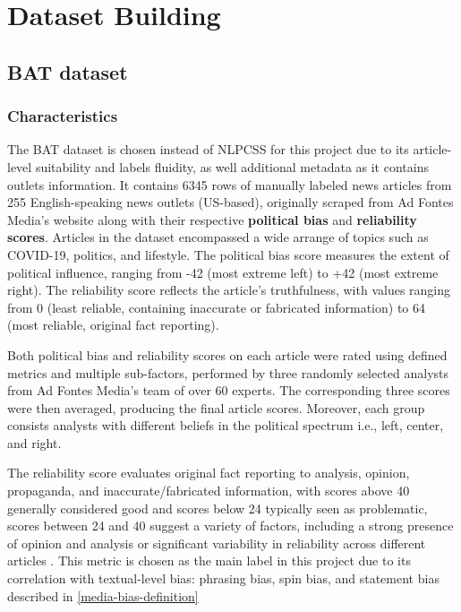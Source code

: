 \chapter{Dataset Building}
\label{cha:4}

\section{BAT dataset}

\subsection{Characteristics} \label{bat-characteristics}

The BAT dataset \cite{spinde-2023-bat} is chosen instead of NLPCSS \cite{chen-etal-2020-nlpcss} for this project due to its article-level suitability and labels fluidity, as well additional metadata as it contains outlets information. It contains 6345 rows of manually labeled news articles from 255 English-speaking news outlets (US-based), originally scraped from Ad Fontes Media's website along with their respective \textbf{political bias} and \textbf{reliability scores}. Articles in the dataset encompassed a wide arrange of topics such as COVID-19, politics, and lifestyle. The political bias score measures the extent of political influence, ranging from -42 (most extreme left) to +42 (most extreme right). The reliability score reflects the article's truthfulness, with values ranging from 0 (least reliable, containing inaccurate or fabricated information) to 64 (most reliable, original fact reporting).

Both political bias and reliability scores on each article were rated using defined metrics and multiple sub-factors, performed by three randomly selected analysts from Ad Fontes Media's team of over 60 experts. The corresponding three scores were then averaged, producing the final article scores. Moreover, each group consists analysts with different beliefs in the political spectrum i.e., left, center, and right.

The reliability score evaluates original fact reporting to analysis, opinion, propaganda, and inaccurate/fabricated information, with scores above 40 generally considered good and scores below 24 typically seen as problematic, scores between 24 and 40 suggest a variety of factors, including a strong presence of opinion and analysis or significant variability in reliability across different articles \cite{adfontes}. This metric is chosen as the main label in this project due to its correlation with textual-level bias: phrasing bias, spin bias, and statement bias described in \ref{media-bias-definition}

